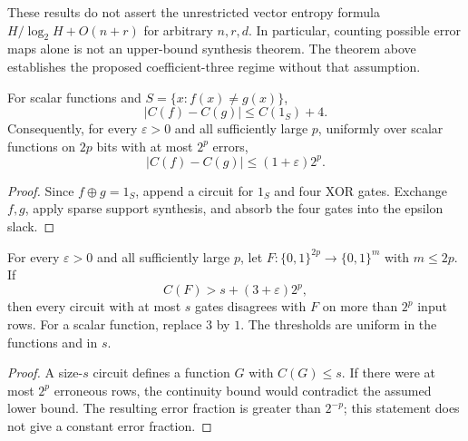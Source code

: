 These results do not assert the unrestricted vector entropy formula
$H/\log_2 H+O(n+r)$ for arbitrary $n,r,d$. In particular, counting possible
error maps alone is not an upper-bound synthesis theorem. The theorem above
establishes the proposed coefficient-three regime without that assumption.

\begin{theorem}
  \label{thm:lowerbounds-scalar-square-root-correction}
  \leanok
  For scalar functions and $S=\{x:f(x)\ne g(x)\}$,
  \[
    |C(f)-C(g)|\le C(1_S)+4.
  \]
  Consequently, for every $\varepsilon>0$ and all sufficiently large $p$,
  uniformly over scalar functions on $2p$ bits with at most $2^p$ errors,
  \[
    |C(f)-C(g)|\le(1+\varepsilon)2^p.
  \]
\end{theorem}
\begin{proof}
  \leanok
  Since $f\oplus g=1_S$, append a circuit for $1_S$ and four XOR gates.
  Exchange $f,g$, apply sparse support synthesis, and absorb the four gates
  into the epsilon slack.
\end{proof}

\begin{corollary}
  \label{cor:lowerbounds-sparse-hardness-transfer}
  \leanok
  For every $\varepsilon>0$ and all sufficiently large $p$, let
  $F:\{0,1\}^{2p}\to\{0,1\}^m$ with $m\le2p$. If
  \[
    C(F)>s+(3+\varepsilon)2^p,
  \]
  then every circuit with at most $s$ gates disagrees with $F$ on more than
  $2^p$ input rows. For a scalar function, replace $3$ by $1$.
  The thresholds are uniform in the functions and in $s$.
\end{corollary}
\begin{proof}
  \leanok
  A size-$s$ circuit defines a function $G$ with $C(G)\le s$. If there
  were at most $2^p$ erroneous rows, the continuity bound would contradict
  the assumed lower bound. The resulting error fraction is greater than
  $2^{-p}$; this statement does not give a constant error fraction.
\end{proof}

